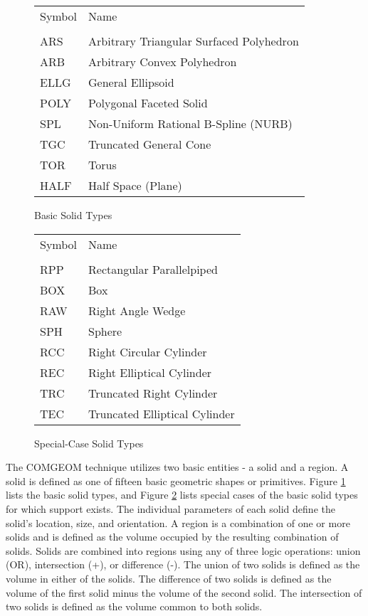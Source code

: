 \begin{figure}[tb]
\begin{tabular}{l l}
Symbol & Name \\
\\
ARS	& Arbitrary Triangular Surfaced Polyhedron \\
ARB	& Arbitrary Convex Polyhedron \\
ELLG	& General Ellipsoid \\
POLY	& Polygonal Faceted Solid \\
SPL	& Non-Uniform Rational B-Spline (NURB) \\
TGC	& Truncated General Cone \\
TOR	& Torus \\
HALF	& Half Space (Plane)
\end{tabular}
\caption{Basic Solid Types \label{list-of-basic-solids} }
\end{figure}
\begin{figure}[tb]
\begin{tabular}{l l}
Symbol & Name \\
\\
RPP	& Rectangular Parallelpiped \\
BOX	& Box \\
RAW	& Right Angle Wedge \\
SPH	& Sphere \\
RCC	& Right Circular Cylinder \\
REC	& Right Elliptical Cylinder \\
TRC	& Truncated Right Cylinder \\
TEC	& Truncated Elliptical Cylinder \\
\end{tabular}
\caption{Special-Case Solid Types \label{list-of-special-case-solids} }
\end{figure}
The COMGEOM technique utilizes two basic entities - a solid and a region.
A solid is defined as one of fifteen basic geometric shapes or
primitives.  Figure \ref{list-of-basic-solids} lists the
basic solid types, and Figure \ref{list-of-special-case-solids}
lists special cases of the basic solid types for which support exists.
The individual parameters of each solid define the solid's
location, size, and orientation.  A region is a combination of  
one or more solids and is defined as the volume occupied 
by the resulting combination of solids.
Solids are combined into regions using any of three logic
operations: union (OR), intersection (+), or difference (-).
The union of two solids is defined as the volume in either
of the solids.
The difference of two solids is defined as the volume of the first
solid minus the volume of the second solid.
The intersection of two solids is defined as the volume 
common to both solids.

